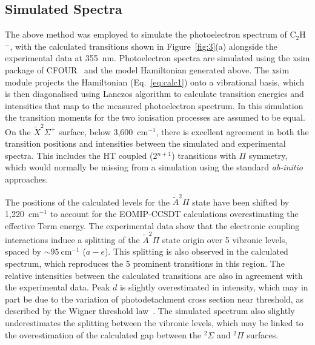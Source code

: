 \documentclass[aip,graphicx]{revtex4-1}
\begin{document}
\subsection{Simulated Spectra}
The above method was employed to simulate the photoelectron spectrum of C$_2$H$^-$, with the calculated transitions shown in Figure~\ref{fig:3}(a) alongside the experimental data at 355~nm. Photoelectron spectra are simulated using the xsim package of CFOUR~\cite{dev20} and the model Hamiltonian generated above. The xsim module projects the Hamiltonian (Eq.~\ref{eq:calc1}) onto a vibrational basis, which is then diagonalised using Lanczos algorithm to calculate transition energies and intensities that map to the measured photoelectron spectrum. In this simulation the transition moments for the two ionisation processes are assumed to be equal.   
On the $\tilde{X} ^2\Sigma^+$ surface, below 3,600~cm$^{-1}$, there is excellent agreement in both the transition positions and intensities between the simulated and experimental spectra. This includes the HT coupled (2$^{n+1}$) transitions with $\Pi$ symmetry, which would normally be missing from a simulation using the standard \emph{ab-initio} approaches. 

The positions of the calculated levels for the $\tilde{A}^2\Pi$ state have been shifted by 1,220~cm$^{-1}$ to account for the EOMIP-CCSDT calculations overestimating the effective Term energy. The experimental data show that the electronic coupling interactions induce a splitting of the $\tilde{A} ^2\Pi$ state origin over 5 vibronic levels, spaced by $\sim 95~$cm$^{-1}$ ($a-e$). This splitting is also observed in the calculated spectrum, which reproduces the 5 prominent transitions in this region. The relative intensities between the calculated transitions are also in agreement with the experimental data. Peak $d$ is slightly overestimated in intensity, which may in part be due to the variation of photodetachment cross section near threshold, as described by the Wigner threshold law~\cite{wig48}. The simulated spectrum also slightly underestimates the splitting between the vibronic levels, which may be linked to the overestimation of the calculated gap between the $^2\Sigma$ and $^2\Pi$ surfaces.
\end{document}
